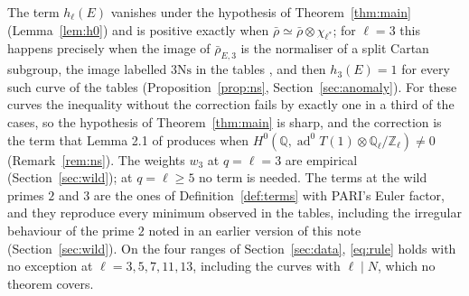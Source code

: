 \documentclass[11pt]{amsart}
\theoremstyle{definition}
\newcommand{\Q}{\mathbb{Q}}
\newcommand{\Z}{\mathbb{Z}}
\newcommand{\ad}{\operatorname{ad}^0}
\newcommand{\Ns}{3\mathrm{Ns}}
\begin{document}
The term $h_\ell(E)$ vanishes under the hypothesis of Theorem~\ref{thm:main} (Lemma~\ref{lem:h0}) and is positive exactly when $\bar\rho\simeq\bar\rho\otimes\chi_{\ell^*}$; for $\ell=3$ this happens precisely when the image of $\bar\rho_{E,3}$ is the normaliser of a split Cartan subgroup, the image labelled $\Ns$ in the tables \cite{Sutherland16}, and then $h_3(E)=1$ for every such curve of the tables (Proposition~\ref{prop:ns}, Section~\ref{sec:anomaly}). For these curves the inequality without the correction fails by exactly one in a third of the cases, so the hypothesis of Theorem~\ref{thm:main} is sharp, and the correction is the term that Lemma 2.1 of \cite{DFG04} produces when $H^0(\Q,\ad T(1)\otimes\Q_\ell/\Z_\ell)\ne0$ (Remark~\ref{rem:ns}). The weights $w_3$ at $q=\ell=3$ are empirical (Section~\ref{sec:wild}); at $q=\ell\ge5$ no term is needed. The terms at the wild primes $2$ and $3$ are the ones of Definition~\ref{def:terms} with PARI's Euler factor, and they reproduce every minimum observed in the tables, including the irregular behaviour of the prime $2$ noted in an earlier version of this note (Section~\ref{sec:wild}). On the four ranges of Section~\ref{sec:data}, \eqref{eq:rule} holds with no exception at $\ell=3,5,7,11,13$, including the curves with $\ell\mid N$, which no theorem covers.
\end{document}
